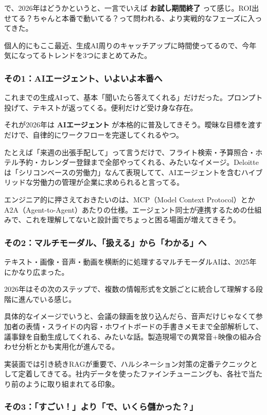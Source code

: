 \documentclass[11pt]{article}
\begin{document}
で、2026年はどうかというと、一言でいえば \textbf{お試し期間終了} って感じ。ROI出せてる？ちゃんと本番で動いてる？って問われる、より実戦的なフェーズに入ってきた。

個人的にもここ最近、生成AI周りのキャッチアップに時間使ってるので、今年気になってるトレンドを3つにまとめてみた。
\subsubsection{その1：AIエージェント、いよいよ本番へ}
\label{sec:orga765221}

これまでの生成AIって、基本「聞いたら答えてくれる」だけだった。プロンプト投げて、テキストが返ってくる。便利だけど受け身な存在。

それが2026年は \textbf{AIエージェント} が本格的に普及してきそう。曖昧な目標を渡すだけで、自律的にワークフローを完遂してくれるやつ。

たとえば「来週の出張手配して」って言うだけで、フライト検索・予算照合・ホテル予約・カレンダー登録まで全部やってくれる、みたいなイメージ。Deloitteは「シリコンベースの労働力」なんて表現してて、AIエージェントを含むハイブリッドな労働力の管理が企業に求められると言ってる。

エンジニア的に押さえておきたいのは、MCP（Model Context Protocol）とかA2A（Agent-to-Agent）あたりの仕様。エージェント同士が連携するための仕組みで、これを理解してないと設計面でちょっと困る場面が増えてきそう。
\subsubsection{その2：マルチモーダル、「扱える」から「わかる」へ}
\label{sec:orga829e6c}

テキスト・画像・音声・動画を横断的に処理するマルチモーダルAIは、2025年にかなり広まった。

2026年はその次のステップで、複数の情報形式を文脈ごとに統合して理解する段階に進んでいる感じ。

具体的なイメージでいうと、会議の録画を放り込んだら、音声だけじゃなくて参加者の表情・スライドの内容・ホワイトボードの手書きメモまで全部解析して、議事録を自動生成してくれる、みたいな話。製造現場での異常音+映像の組み合わせ分析とかも実用化が進んでる。

実装面では引き続きRAGが重要で、ハルシネーション対策の定番テクニックとして定着してきてる。社内データを使ったファインチューニングも、各社で当たり前のように取り組まれてる印象。
\subsubsection{その3：「すごい！」より「で、いくら儲かった？」}
\label{sec:orgdeef02f}
\end{document}
